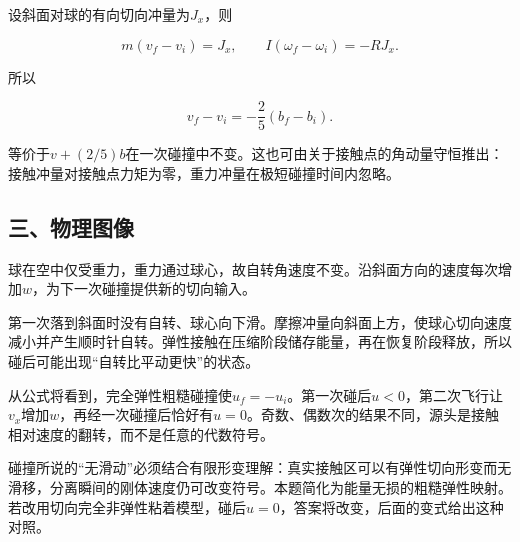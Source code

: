 \documentclass[12pt,a4paper,fontset=fandol]{ctexart}
\begin{document}
设斜面对球的有向切向冲量为\(J_x\)，则

\[
m(v_f-v_i)=J_x,\qquad
I(\omega_f-\omega_i)=-RJ_x.
\]

所以

\[
v_f-v_i=-\frac25(b_f-b_i).
\]

等价于\(v+(2/5)b\)在一次碰撞中不变。这也可由关于接触点的角动量守恒推出：接触冲量对接触点力矩为零，重力冲量在极短碰撞时间内忽略。

\subsection{三、物理图像}\label{ux4e09ux7269ux7406ux56feux50cf-2}

球在空中仅受重力，重力通过球心，故自转角速度不变。沿斜面方向的速度每次增加\(w\)，为下一次碰撞提供新的切向输入。

第一次落到斜面时没有自转、球心向下滑。摩擦冲量向斜面上方，使球心切向速度减小并产生顺时针自转。弹性接触在压缩阶段储存能量，再在恢复阶段释放，所以碰后可能出现``自转比平动更快''的状态。

\begin{center}
\begin{minipage}{\linewidth}
\centering\begingroup{}
\ifdim\wd\diagrambox>.88\linewidth
\sbox{\diagrambox}{\resizebox{.88\linewidth}{!}{\usebox{\diagrambox}}}\fi
\ifdim\ht\diagrambox>.38\textheight
\resizebox{!}{.38\textheight}{\usebox{\diagrambox}}
\else\usebox{\diagrambox}\fi
\par{}\endgroup\end{minipage}\end{center}

从公式将看到，完全弹性粗糙碰撞使\(u_f=-u_i\)。第一次碰后\(u<0\)，第二次飞行让\(v_x\)增加\(w\)，再经一次碰撞后恰好有\(u=0\)。奇数、偶数次的结果不同，源头是接触相对速度的翻转，而不是任意的代数符号。

碰撞所说的``无滑动''必须结合有限形变理解：真实接触区可以有弹性切向形变而无滑移，分离瞬间的刚体速度仍可改变符号。本题简化为能量无损的粗糙弹性映射。若改用切向完全非弹性粘着模型，碰后\(u=0\)，答案将改变，后面的变式给出这种对照。
\end{document}
